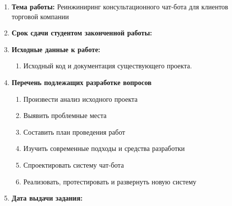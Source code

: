 \begin{titlepage}
    \begin{enumerate}
        \item \textbf{Тема работы:} Реинжиниринг консультационного чат-бота для клиентов торговой компании
        \item \textbf{Срок сдачи студентом законченной работы:}
        \item \textbf{Исходные данные к работе:}
        \begin{enumerate}
            \item Исходный код и документация существующего проекта.
        \end{enumerate}
        \item \textbf{Перечень подлежащих разработке вопросов}
        \begin{enumerate}
            \item Произвести анализ исходного проекта
            \item Выявить проблемные места
            \item Составить план проведения работ
            \item Изучить современные подходы и средства разработки
            \item Спроектировать систему чат-бота
            \item Реализовать, протестировать и развернуть новую систему
        \end{enumerate}
        \item \textbf{Дата выдачи задания:}
    \end{enumerate}

\end{titlepage}
